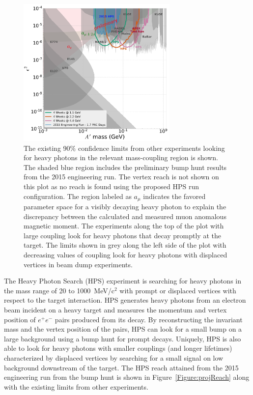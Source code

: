 \begin{figure}[htb]
  \centering
      \includegraphics[width=0.7\textwidth]{pics/intro/reach_nominal.png}
  \caption[Reach for the HPS experiment]{The existing 90$\%$ confidence limits from other experiments looking for heavy photons in the relevant mass-coupling region is shown. The shaded blue region includes the preliminary bump hunt results from the 2015 engineering run. The vertex reach is not shown on this plot as no reach is found using the proposed HPS run configuration. The region labeled as $a_\mu$ indicates the favored parameter space for a visibly decaying heavy photon to explain the discrepancy between the calculated and measured muon anomalous magnetic moment. The experiments along the top of the plot with large coupling look for heavy photons that decay promptly at the target. The limits shown in grey along the left side of the plot with decreasing values of coupling look for heavy photons with displaced vertices in beam dump experiments.}
      \label{Figure:projectedReach}
\end{figure}
\indent The Heavy Photon Search (HPS) experiment is searching for heavy photons in the mass range of 20 to 1000~MeV/c$^2$ with prompt or displaced vertices with respect to the target interaction. HPS  generates heavy photons from an electron beam incident on a heavy target and measures the momentum and vertex position of $e^+e^-$ pairs produced from its decay. By reconstructing the invariant mass and the vertex position of the pairs, HPS can look for a small bump on a large background using a bump hunt for prompt decays. Uniquely, HPS is also able to look for heavy photons with smaller couplings (and longer lifetimes) characterized by displaced vertices by searching for a small signal on low background downstream of the target. The HPS reach attained from the 2015 engineering run from the bump hunt is shown in Figure~\ref{Figure:projReach} along with the existing limits from other experiments.\\
